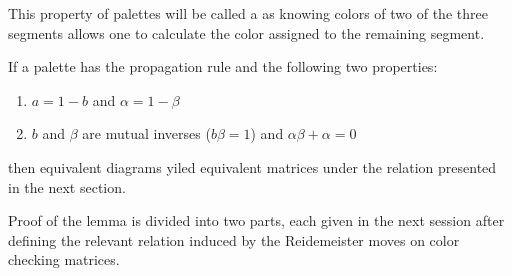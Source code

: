     This property of palettes will be called a  as knowing colors of two of the three segments allows one to calculate the color assigned to the remaining segment.

    \begin{lemma}\label{warunki na palete}
  If a palette has the propagation rule and the following two properties:
  \begin{enumerate}
    \item $a=1-b$ and $\alpha=1-\beta$
    \item $b$ and $\beta$ are mutual inverses ($b\beta=1$) and $\alpha\beta+\alpha=0$
  \end{enumerate}
    then equivalent diagrams yiled equivalent matrices under the relation presented in the next section.
\end{lemma}

Proof of the lemma is divided into two parts, each given in the next session after defining the relevant relation induced by the Reidemeister moves on color checking matrices.
